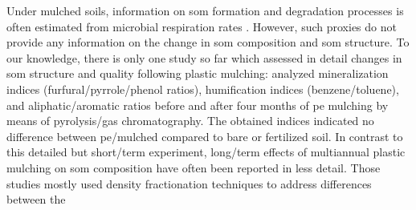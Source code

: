 Under mulched soils, information on \ac{som} formation and degradation processes is often estimated from microbial respiration rates \citep{LiDynamics2004,MorenoEffect2008}. However, such proxies do not provide any information on the change in \ac{som} composition and \ac{som} structure. To our knowledge, there is only one study so far which assessed in detail changes in \ac{som} structure and quality following plastic mulching: \citet{CeccantiPyrolysisgas2007} analyzed mineralization indices (furfural\slash pyrrole\slash phenol ratios), humification indices (benzene\slash toluene), and aliphatic\slash aromatic ratios before and after four months of \ac{pe} mulching by means of pyrolysis\-/gas chromatography.
The obtained indices indicated no difference between \ac{pe}\-/mulched compared to bare or fertilized soil. In contrast to this detailed but short\-/term experiment, long\-/term effects of multiannual plastic mulching on \ac{som} composition have often been reported in less detail. Those studies mostly used density fractionation techniques to address differences between the
